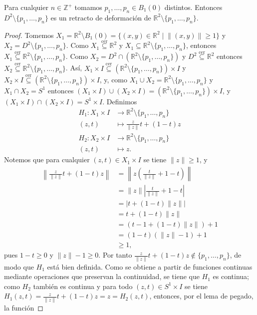 \begin{Lema}\label{Lema:Disco_menos_puntos_retracto_de_plano_menos_puntos}
Para cualquier $n\in\mathbb{Z}^+$ tomamos $p_1,\dots,p_n\in B_1(0)$ distintos. Entonces $D^2\setminus\{p_1,\dots,p_n\}$ es un retracto de deformación de $\mathbb{R}^2\setminus\{p_1,\dots,p_n\}$.
\end{Lema}
\begin{proof}
Tomemos $X_1=\mathbb{R}^2\setminus B_1(0)=\{(x,y)\in\mathbb{R}^2\mid\lVert(x,y)\rVert\geq1\}$ y $X_2=D^2\setminus\{p_1,\dots,p_n\}$. Como $X_1\overset{\text{cer}}{\subseteq}\mathbb{R}^2$ y $X_1\subseteq\mathbb{R}^2\setminus\{p_1,\dots,p_n\}$, entonces $X_1\overset{\text{cer}}{\subseteq}\mathbb{R}^2\setminus\{p_1,\dots,p_n\}$. Como $X_2=D^2\cap\left( \mathbb{R}^2\setminus\{p_1,\dots,p_n\} \right)$ y $D^2\overset{\text{cer}}{\subseteq}\mathbb{R}^2$ entonces $X_2\overset{\text{cer}}{\subseteq}\mathbb{R}^2\setminus\{p_1,\dots,p_n\}$. Así, $X_1\times I\overset{\text{cer}}{\subseteq}(\mathbb{R}^2\setminus\{p_1,\dots,p_n\})\times I$ y $X_2\times I\overset{\text{cer}}{\subseteq}(\mathbb{R}^2\setminus\{p_1,\dots,p_n\})\times I$, y, como $X_1\cup X_2=\mathbb{R}^2\setminus\{p_1,\dots,p_n\}$ y $X_1\cap X_2=S^1$ entonces $(X_1\times I)\cup(X_2\times I)=(\mathbb{R}^2\setminus\{p_1,\dots,p_n\})\times I$, y $(X_1\times I)\cap(X_2\times I)=S^1\times I$. Definimos
\begin{align*}
H_1:X_1\times I&\longrightarrow\mathbb{R}^2\setminus\{p_1,\dots,p_n\}\\
(z,t)&\longmapsto\frac{z}{\lVert z\rVert}t+(1-t)z\\
H_2:X_2\times I&\longrightarrow\mathbb{R}^2\setminus\{p_1,\dots,p_n\}\\
(z,t)&\longmapsto z.
\end{align*}
Notemos que para cualquier $(z,t)\in X_1\times I$ se tiene $\lVert z\rVert\geq1$, y
\begin{align*}
\left\lVert\frac{z}{\lVert z\rVert}t+(1-t)z\right\rVert&=\left\lVert z\left(\frac{t}{\lVert z\rVert}+1-t\right)\right\rVert\\
&=\lVert z\rVert\left|\frac{t}{\lVert z\rVert}+1-t\right|\\
&=\left|t+(1-t)\lVert z\rVert\right|\\
&=t+(1-t)\lVert z\rVert\\
&=\left(t-1+(1-t)\lVert z\rVert\right)+1\\
&=(1-t)\left(\lVert z\rVert-1\right)+1\\
&\geq1,
\end{align*}
pues $1-t\geq0$ y $\lVert z\rVert-1\geq0$. Por tanto $\frac{z}{\lVert z\rVert}t+(1-t)z\notin\{p_1,\dots,p_n\}$, de modo que $H_1$ está bien definida. Como se obtiene a partir de funciones continuas mediante operaciones que preservan la continuidad, se tiene que $H_1$ es continua; como $H_2$ también es continua y para todo $(z,t)\in S^1\times I$ se tiene $H_1(z,t)=\frac{z}{\lVert z\rVert}t+(1-t)z=z=H_2(z,t)$, entonces, por el lema de pegado, la función

\end{proof}
